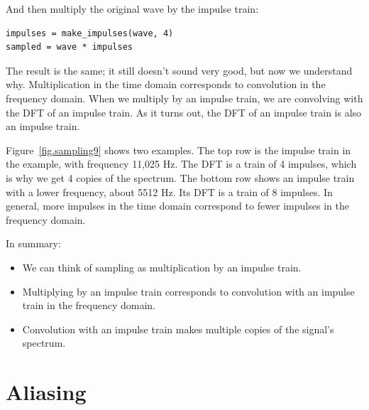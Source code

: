 \documentclass[12pt]{book}
\begin{document}
And then multiply the original wave by the impulse train:

\begin{verbatim}
impulses = make_impulses(wave, 4)
sampled = wave * impulses
\end{verbatim}

The result is the same; it still doesn't sound very good, but now
we understand why.  Multiplication in the time domain corresponds
to convolution in the frequency domain.  When we multiply
by an impulse train, we are convolving with the DFT of an
impulse train.  As it turns out, the DFT of an impulse
train is also an impulse train.

Figure~\ref{fig.sampling9} shows two examples.  The top row is
the impulse train in the example, with frequency 11,025 Hz.
The DFT is a train of 4 impulses, which is why we get 4 copies
of the spectrum.  The bottom row shows an impulse
train with a lower frequency, about 5512 Hz.  Its DFT is a train
of 8 impulses.  In general, more impulses in the time
domain correspond to fewer impulses in the frequency
domain.

In summary:

\begin{itemize}

\item We can think of sampling as multiplication by an impulse train.

\item Multiplying by an impulse train corresponds
to convolution with an impulse train in the frequency domain.

\item Convolution with an impulse train makes multiple copies of the
signal's spectrum.

\end{itemize}


\section{Aliasing}
\end{document}
